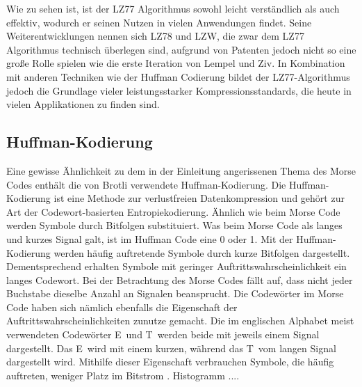 Wie zu sehen ist, ist der LZ77 Algorithmus sowohl leicht verständlich als auch effektiv, wodurch er seinen Nutzen in vielen Anwendungen findet.
Seine Weiterentwicklungen nennen sich LZ78 und LZW, die zwar dem LZ77 Algorithmus technisch überlegen sind, aufgrund von Patenten jedoch nicht so eine große Rolle spielen wie die erste Iteration von Lempel und Ziv.
In Kombination mit anderen Techniken wie der Huffman Codierung bildet der LZ77-Algorithmus jedoch die Grundlage vieler leistungsstarker Kompressionsstandards, die heute in vielen Applikationen zu finden sind. \newline

\subsection{Huffman-Kodierung}
\label{subsec:huffman}
Eine gewisse Ähnlichkeit zu dem in der Einleitung angerissenen Thema des Morse Codes enthält die von Brotli verwendete Huffman-Kodierung.
Die Huffman-Kodierung ist eine Methode zur verlustfreien Datenkompression und gehört zur Art der Codewort-basierten Entropiekodierung.
Ähnlich wie beim Morse Code werden Symbole durch Bitfolgen substituiert.
Was beim Morse Code als langes und kurzes Signal galt, ist im Huffman Code eine 0 oder 1.
Mit der Huffman-Kodierung werden häufig auftretende Symbole durch kurze Bitfolgen dargestellt.
Dementsprechend erhalten Symbole mit geringer Auftrittswahrscheinlichkeit ein langes Codewort.
Bei der Betrachtung des Morse Codes fällt auf, dass nicht jeder Buchstabe dieselbe Anzahl an Signalen beansprucht.
Die Codewörter im Morse Code haben sich nämlich ebenfalls die Eigenschaft der Auftrittswahrscheinlichkeiten zunutze gemacht.
Die im englischen Alphabet meist verwendeten Codewörter \glqq E\grqq\ und \glqq T\grqq\ werden beide mit jeweils einem Signal dargestellt.
Das \glqq E\grqq\ wird mit einem kurzen, während das \glqq T\grqq\ vom langen Signal dargestellt wird.
Mithilfe dieser Eigenschaft verbrauchen Symbole, die häufig auftreten, weniger Platz im Bitstrom \cite{Moffat2019}.
Histogramm ....

